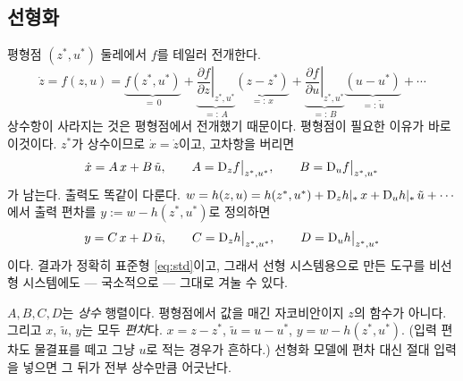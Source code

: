 \documentclass[11pt]{article}
\begin{document}
\subsection{선형화}\label{sec:lin}
평형점 $(z^{*},u^{*})$ 둘레에서 $f$를 테일러 전개한다.
\[
   \dot z = f(z,u)
   = \underbrace{f(z^{*},u^{*})}_{=\,0}
   + \underbrace{\left.\frac{\partial f}{\partial z}\right|_{z^{*},u^{*}}}_{=:\,A}
     \underbrace{(z-z^{*})}_{=:\,x}
   + \underbrace{\left.\frac{\partial f}{\partial u}\right|_{z^{*},u^{*}}}_{=:\,B}
     \underbrace{(u-u^{*})}_{=:\,\tilde u}
   + \cdots
\]
상수항이 사라지는 것은 평형점에서 전개했기 때문이다. 평형점이 필요한 이유가
바로 이것이다. $z^{*}$가 상수이므로 $\dot x=\dot z$이고, 고차항을 버리면
\begin{equation}\label{eq:linAB}
   \dot x = A\,x + B\,\tilde u,\qquad
   A = \mathrm{D}_{z}f\bigl|_{z^{*},u^{*}},\qquad
   B = \mathrm{D}_{u}f\bigl|_{z^{*},u^{*}}
\end{equation}
가 남는다. 출력도 똑같이 다룬다.
$w = h(z,u) = h(z^{*},u^{*}) + \mathrm{D}_{z}h|_{*}\,x + \mathrm{D}_{u}h|_{*}\,\tilde u + \cdots$
에서 출력 편차를 $y := w - h(z^{*},u^{*})$로 정의하면
\begin{equation}\label{eq:linCD}
   y = C\,x + D\,\tilde u,\qquad
   C = \mathrm{D}_{z}h\bigl|_{z^{*},u^{*}},\qquad
   D = \mathrm{D}_{u}h\bigl|_{z^{*},u^{*}}
\end{equation}
이다. 결과가 정확히 표준형 \eqref{eq:std}이고, 그래서 선형 시스템용으로 만든
도구를 비선형 시스템에도 --- 국소적으로 --- 그대로 겨눌 수 있다.

\begin{caution}
$A,B,C,D$는 \emph{상수} 행렬이다. 평형점에서 값을 매긴 자코비안이지 $z$의
함수가 아니다. 그리고 $x$, $\tilde u$, $y$는 모두 \emph{편차}다.
$x=z-z^{*}$, $\tilde u=u-u^{*}$, $y=w-h(z^{*},u^{*})$. (입력 편차도 물결표를
떼고 그냥 $u$로 적는 경우가 흔하다.) 선형화 모델에 편차 대신 절대 입력을 넣으면
그 뒤가 전부 상수만큼 어긋난다.
\end{caution}
\end{document}

